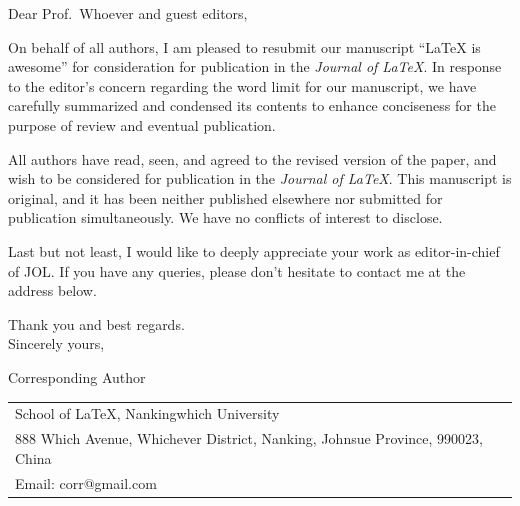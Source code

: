 \documentclass{article}
\begin{document}
\bigskip %

Dear Prof.\ Whoever and guest editors,

\bigskip %


On behalf of all authors, I am pleased to resubmit our manuscript “LaTeX is awesome” for consideration for publication in the \textit{Journal of LaTeX}.
In response to the editor's concern regarding the word limit for our manuscript, we have carefully summarized and condensed its contents to enhance conciseness for the purpose of review and eventual publication.

All authors have read, seen, and agreed to the revised version of the paper, and wish to be considered for publication in the \textit{Journal of LaTeX}.
This manuscript is original, and it has been neither published elsewhere nor submitted for publication simultaneously.
We have no conflicts of interest to disclose.
 
Last but not least, I would like to deeply appreciate your work as editor-in-chief of JOL.
If you have any queries, please don’t hesitate to contact me at the address below.

\bigskip %

Thank you and best regards.\\
Sincerely yours,


Corresponding Author\\


\hfill
\begin{tabular}{l @{}}
\hfill School of LaTeX, Nankingwhich University\\
\hfill 888 Which Avenue, Whichever District, Nanking, Johnsue Province, 990023, China \\ %
\hfill Email: corr@gmail.com
\end{tabular}
\end{document}
